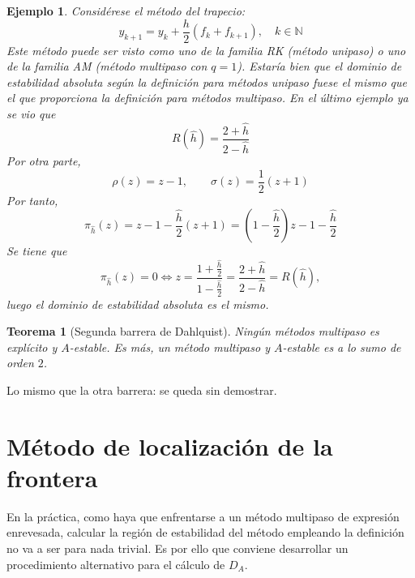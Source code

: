 \documentclass[11pt]{report}
\makeatletter
\renewenvironment{proof}[1][\proofname]{\par
  \pushQED{\qed}%
  \normalfont \topsep\z@skip %
  \trivlist
  \item[\hskip\labelsep
        \itshape
    #1\@addpunct{.}]\ignorespaces
}{%
  \popQED\endtrivlist\@endpefalse
}
\theoremstyle{mytheorem}
\newtheorem{theorem}{Teorema}
\theoremstyle{mydefinition}
\theoremstyle{myexample}
\newtheorem*{example}{Ejemplo}
\let\oldproofname=\proofname
\renewcommand{\proofname}{\rm\bf{\oldproofname}}}
\newenvironment{ctheorem} %
  {\begin{mdframed}[
        linewidth=3pt,
        linecolor=c2,
        bottomline=false,
        topline=false,
        rightline=false,
        innerrightmargin=0pt,
        innertopmargin=0pt,
        innerbottommargin=0pt,
        innerleftmargin=1em, %
        skipabove=\baselineskip]
    \begin{theorem}}
  {\end{theorem}\end{mdframed}}
\newcommand{\N}{\mathbb N}
\makeatother
\begin{document}
\vspace{\parskip}

\begin{example}
Considérese el método del trapecio:
\[y_{k+1} = y_k+\frac{h}{2}\left(f_k+f_{k+1}\right), \quad k \in \N\]
Este método puede ser visto como uno de la familia RK (método unipaso) o uno de la familia AM (método multipaso con $q = 1$). Estaría bien que el dominio de estabilidad absoluta según la definición para métodos unipaso fuese el mismo que el que proporciona la definición para métodos multipaso. En el último ejemplo ya se vio que
\[R(\hat{h}) = \frac{2+\hat{h}}{2-\hat{h}}\]
Por otra parte,
\[\rho(z) = z-1, \qquad \sigma(z)=\frac{1}{2}(z+1)\]
Por tanto,
\[\pi_{\hat{h}}(z) = z-1-\frac{\hat{h}}{2}(z+1) = \left(1-\frac{\hat{h}}{2}\right)z-1-\frac{\hat{h}}{2}\]
Se tiene que
\[\pi_{\hat{h}}(z) = 0 \iff z = \frac{1+\frac{\hat{h}}{2}}{1-\frac{\hat{h}}{2}} = \frac{2+\hat{h}}{2-\hat{h}} = R(\hat{h}),\]
luego el dominio de estabilidad absoluta es el mismo.
\end{example}

\begin{ctheorem}[Segunda barrera de Dahlquist]
Ningún métodos multipaso es explícito y $A$-estable. Es más, un método multipaso y $A$-estable es a lo sumo de orden $2$.
\end{ctheorem}

\begin{proof}
Lo mismo que la otra barrera: se queda sin demostrar.
\end{proof}

\section{Método de localización de la frontera}

En la práctica, como haya que enfrentarse a un método multipaso de expresión enrevesada, calcular la región de estabilidad del método empleando la definición no va a ser para nada trivial. Es por ello que conviene desarrollar un procedimiento alternativo para el cálculo de $D_A$.
\end{document}
